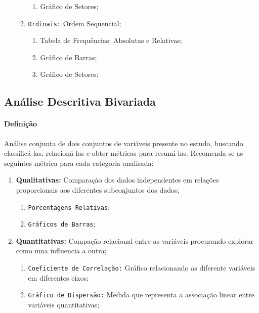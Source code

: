 \documentclass{article}
\begin{document}
\begin{enumerate}[noitemsep]
\begin{enumerate}[noitemsep]
\begin{enumerate}[noitemsep]
                                    \item Gráfico de Setores;
                                \end{enumerate}
                            \item \texttt{Ordinais:} Ordem Sequencial;
                                \begin{enumerate}[noitemsep]
                                    \item Tabela de Frequências: Absolutas e Relativas;
                                    \item Gráfico de Barras;
                                    \item Gráfico de Setores;
                                \end{enumerate}
                        \end{enumerate}
                \end{enumerate}

        \subsection{Análise Descritiva Bivariada}
            \paragraph{Definição}Análise conjunta de dois conjuntos de variáveis presente no estudo, buscando classificá-las, relacioná-las e obter métricas para resumi-las. Recomenda-se as seguintes métrica para cada categoria analisada:
                \begin{enumerate}[noitemsep]
                    \item \textbf{Qualitativas:} Comparação dos dados independentes em relações proporcionais aos diferentes subconjuntos dos dados;
                        \begin{enumerate}[noitemsep]
                            \item \texttt{Porcentagens Relativas};
                            \item \texttt{Gráficos de Barras};
                        \end{enumerate}
                    \item \textbf{Quantitativas:} Compação relacional entre as variáveis procurando explorar como uma influencia a outra;
                        \begin{enumerate}[noitemsep]
                            \item \texttt{Coeficiente de Correlação:} Gráfico relacionando as diferente variáveis em diferentes eixos;
                            \item \texttt{Gráfico de Dispersão:} Medida que representa a associação linear entre variáveis quantitativas;
                        \end{enumerate}
                \end{enumerate}
\newpage
\end{document}

